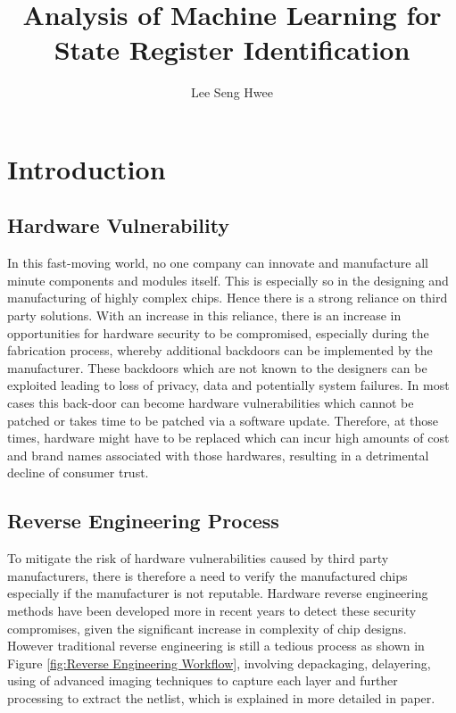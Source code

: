 \documentclass{tum-book}
\title{Analysis of Machine Learning for State Register Identification}
\author{Lee Seng Hwee}
\begin{document}
\printthesisdisclaimer

\frontmatter

\cleardoublepage
\printnomenclature[3cm]


\tableofcontents

\mainmatter

\chapter{Introduction}
    \section{Hardware Vulnerability}\label{Hardware Vulnerability}
    In this fast-moving world, no one company can innovate and manufacture all minute components and modules itself. This is especially so in the designing and manufacturing of highly complex chips. Hence there is a strong reliance on third party solutions. With an increase in this reliance, there is an increase in opportunities for hardware security to be compromised, especially during the fabrication process, whereby additional backdoors can be implemented by the manufacturer. These backdoors which are not known to the designers can be exploited leading to loss of privacy, data and potentially system failures. In most cases this back-door can become hardware vulnerabilities which cannot be patched or takes time to be patched via a software update. Therefore, at those times, hardware might have to be replaced which can incur high amounts of cost and brand names associated with those hardwares, resulting in a detrimental decline of consumer trust.
    
    \section{Reverse Engineering Process}\label{Reverse Engineering Process}
    To mitigate the risk of hardware vulnerabilities caused by third party manufacturers, there is therefore a need to verify the manufactured chips especially if the manufacturer is not reputable. Hardware reverse engineering methods have been developed more in recent years to detect these security compromises, given the significant increase in complexity of chip designs. However traditional reverse engineering is still a tedious process as shown in Figure \ref{fig:Reverse Engineering Workflow}, involving depackaging, delayering, using of advanced imaging techniques to capture each layer and further processing to extract the netlist, which is explained in more detailed in paper\cite{baehr2020machine}. 
    
\end{document}
